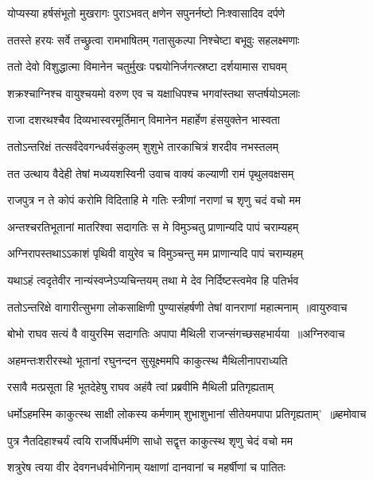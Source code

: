 \twolineshloka
{योप्यस्या हर्षसंभूतो मुखरागः पुराऽभवत्}
{क्षणेन सपुनर्नष्टो निःश्वासादिव दर्पणे}


\twolineshloka
{ततस्ते हरयः सर्वे तच्छ्रुत्वा रामभाषितम्}
{गतासुकल्पा निश्चेष्टा बभूवुः सहलक्ष्मणाः}


\twolineshloka
{ततो देवो विशुद्धात्मा विमानेन चतुर्मुखः}
{पद्मयोनिर्जगत्स्रष्टा दर्शयामास राघवम्}


\twolineshloka
{शक्रश्चाग्निश्च वायुश्चयमो वरुण एव च}
{यक्षाधिपश्च भगवांस्तथा सप्तर्षयोऽमलाः}


\twolineshloka
{राजा दशरथश्चैव दिव्यभास्वरमूर्तिमान्}
{विमानेन महार्हेण हंसयुक्तेन भास्वता}


\twolineshloka
{ततोऽन्तरिक्षं तत्सर्वंदेवगन्धर्वसंकुलम्}
{शुशुभे तारकाचित्रं शरदीव नभस्तलम्}


\twolineshloka
{तत उत्थाय वैदेही तेषां मध्ययशस्विनी}
{उवाच वाक्यं कल्याणी रामं पृथुलवक्षसम्}


\twolineshloka
{राजपुत्र न ते कोपं करोमि विदिताहि मे}
{गतिः स्त्रीणां नराणां च शृणु चदं वचो मम}


\twolineshloka
{अन्तश्चरतिभूतानां मातरिश्वा सदागतिः}
{स मे विमुञ्चतु प्राणान्यदि पापं चराम्यहम्}


\twolineshloka
{अग्निरापस्तथाऽऽकाशं पृथिवी वायुरेव च}
{विमुञ्चन्तु मम प्राणान्यदि पापं चराम्यहम्}


\twolineshloka
{यथाऽहं त्वदृतेवीर नान्यंस्वप्नेऽप्यचिन्तयम्}
{तथा मे देव निर्दिष्टस्त्वमेव हि पतिर्भव}


\threelineshloka
{ततोऽन्तरिक्षे वागारीत्सुभगा लोकसाक्षिणी}
{पुण्यासंहर्षणी तेषां वानराणां महात्मनाम् ॥वायुरुवाच}
{}


\threelineshloka
{बोभो राघव सत्यं वै वायुरस्मि सदागतिः}
{अपापा मैथिली राजन्संगच्छसहभार्यया ॥अग्निरुवाच}
{}


\twolineshloka
{अहमन्तःशरीरस्थो भूतानां रघुनन्दन}
{सुसूक्ष्ममपि काकुत्स्थ मैथिलीनापराध्यति}



\twolineshloka
{रसावै मत्प्रसूता हि भूतदेहेषु राघव}
{अहंवै त्वां प्रब्रवीमि मैथिली प्रतिगृह्यताम्}



\threelineshloka
{धर्मोऽहमस्मि काकुत्स्थ साक्षी लोकस्य कर्मणाम्}
{शुभाशुभानां सीतेयमपापा प्रतिगृह्यताम्' ॥ब्र्हमोवाच}
{}


\twolineshloka
{पुत्र नैतदिहाश्चर्यं त्वयि राजर्षिधर्मणि}
{साधो सद्वृत्त काकुत्स्थ शृणु चेदं वचो मम}


\twolineshloka
{शत्रुरेष त्वया वीर देवगनधर्वभोगिनाम्}
{यक्षाणां दानवानां च महर्षीणां च पातितः}


